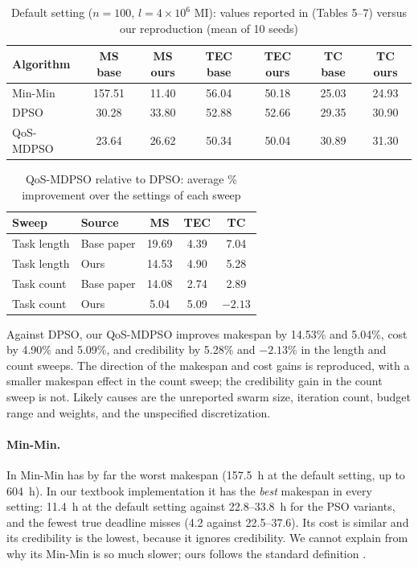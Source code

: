 \documentclass[pdflatex,sn-basic]{sn-jnl}
\theoremstyle{thmstyleone}%
\theoremstyle{thmstyletwo}%
\theoremstyle{thmstylethree}%
\begin{document}
\begin{table}[!t]
\caption{Default setting ($n=100$, $l=4\times10^6$ MI): values reported in \citet{ouyang2025} (Tables 5--7) versus our reproduction (mean of 10 seeds)}\label{tab:rep}
\footnotesize
\begin{tabular}{@{}lcccccc@{}}
\toprule
Algorithm & MS base & MS ours & TEC base & TEC ours & TC base & TC ours\\
\midrule
Min-Min & 157.51 & 11.40 & 56.04 & 50.18 & 25.03 & 24.93\\
DPSO & 30.28 & 33.80 & 52.88 & 52.66 & 29.35 & 30.90\\
QoS-MDPSO & 23.64 & 26.62 & 50.34 & 50.04 & 30.89 & 31.30\\
\bottomrule
\end{tabular}
\end{table}

\begin{table}[!t]
\caption{QoS-MDPSO relative to DPSO: average \% improvement over the settings of each sweep}\label{tab:imp}
\footnotesize
\begin{tabular}{@{}llccc@{}}
\toprule
Sweep & Source & MS & TEC & TC\\
\midrule
Task length & Base paper & 19.69 & 4.39 & 7.04\\
Task length & Ours & 14.53 & 4.90 & 5.28\\
Task count & Base paper & 14.08 & 2.74 & 2.89\\
Task count & Ours & 5.04 & 5.09 & $-2.13$\\
\bottomrule
\end{tabular}
\end{table}

Against DPSO, our QoS-MDPSO improves makespan by 14.53\% and 5.04\%, cost by 4.90\% and 5.09\%, and credibility by 5.28\% and $-2.13$\% in the length and count sweeps. The direction of the makespan and cost gains is reproduced, with a smaller makespan effect in the count sweep; the credibility gain in the count sweep is not. Likely causes are the unreported swarm size, iteration count, budget range and weights, and the unspecified discretization.

\paragraph{Min-Min.} In \citet{ouyang2025} Min-Min has by far the worst makespan (157.5~h at the default setting, up to 604~h). In our textbook implementation it has the \emph{best} makespan in every setting: 11.4~h at the default setting against 22.8--33.8~h for the PSO variants, and the fewest true deadline misses (4.2 against 22.5--37.6). Its cost is similar and its credibility is the lowest, because it ignores credibility. We cannot explain from \citet{ouyang2025} why its Min-Min is so much slower; ours follows the standard definition \citep{maheswaran1999}.
\end{document}
